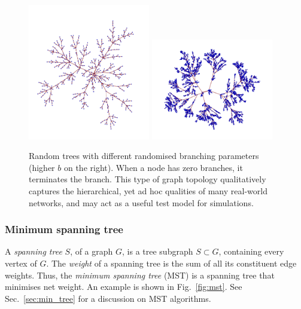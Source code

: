 	\begin{figure}[!htbp]
	\includegraphics[clip=true, width=0.475\textwidth]{random_tree_1}
	\includegraphics[clip=true, width=0.475\textwidth]{random_tree_2}
	\captionspacefig \caption{Random trees with different randomised branching parameters (higher $b$ on the right). When a node has zero branches, it terminates the branch. This type of graph topology qualitatively captures the hierarchical, yet ad hoc qualities of many real-world networks, and may act as a useful test model for simulations.} \label{fig:random_tree}
	\end{figure}
\fi

%
%

\subsubsection{Minimum spanning tree} \label{sec:graph_MST} 

A \textit{spanning tree} $S$, of a graph $G$, is a tree subgraph \mbox{$S\subset G$}, containing every vertex of $G$. The \textit{weight} of a spanning tree is the sum of all its constituent edge weights. Thus, the \textit{minimum spanning tree} (MST) is a spanning tree that minimises net weight. An example is shown in Fig.~\ref{fig:mst}. See Sec.~\ref{sec:min_tree} for a discussion on MST algorithms.

